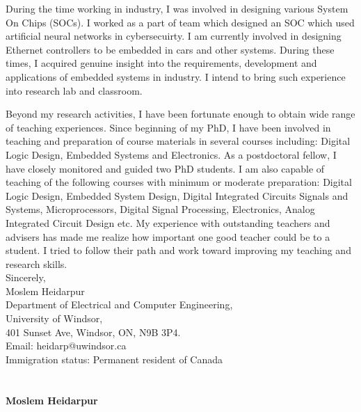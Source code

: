 \documentclass[12pt,oneside]{book}
\begin{document}
During the time working in industry,  I was involved in designing various System On Chips (SOCs). I worked as a part of team which designed an SOC which used artificial neural networks in cybersecuirty. I am currently involved in designing Ethernet controllers to be  embedded in cars and other systems. During these times, I acquired genuine insight into the requirements, development and applications of embedded systems in industry. I intend to bring such experience into research lab and classroom.
 
Beyond my research activities, I have been fortunate enough to obtain wide range of teaching experiences. Since beginning  of my PhD, I have been involved in teaching and preparation of course materials in several courses including: Digital Logic Design, Embedded Systems and Electronics.  As a postdoctoral fellow, I have closely monitored and guided two PhD students. I am also capable of teaching of the following courses with minimum or moderate preparation: Digital Logic Design, Embedded System Design, Digital Integrated Circuits Signals and Systems, Microprocessors, Digital Signal Processing, Electronics, Analog Integrated Circuit Design  etc. 
 My experience with outstanding teachers and advisers has made me realize
 how important one good teacher could be to a student. I tried to follow their path and work toward improving my teaching and research skills. 
\vspace*{1\baselineskip}
\phantom \quad \\
Sincerely,\\[0.2cm]
Moslem Heidarpur\\
Department of Electrical and Computer Engineering,\\
University of Windsor,\\
401 Sunset Ave, Windsor, ON, N9B 3P4.\\
Email: heidarp@uwindsor.ca\\
Immigration status: Permanent resident of Canada\\[-0.1cm]
\newpage
\lhead{\textcolor{gray}{Curriculum vitae}}
\large \bf \hphantom \\ \\ 
 {\selectfont Moslem Heidarpur} \mdseries \normalsize \\ \\ 
\end{document}
